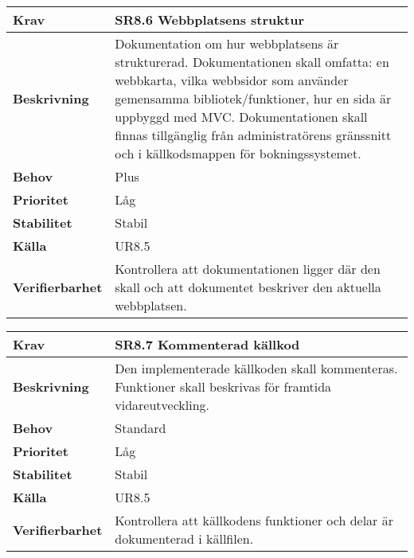 \documentclass[a4paper, twoside, 11pt, titlepage]{article}
\begin{document}
		\begin {table} [ht] \begin{tabular} { p{2.6cm} p{12.5cm} }
			\hline
			\sffamily\textbf{Krav} & \sffamily\textbf{SR8.6 Webbplatsens struktur } \\
			\hline
			\sffamily\textbf{Beskrivning} & Dokumentation om hur webbplatsens är strukturerad. Dokumentationen skall omfatta: en webbkarta, vilka webbsidor som använder gemensamma bibliotek/funktioner, hur en sida är uppbyggd med MVC. Dokumentationen skall finnas tillgänglig från administratörens gränssnitt och i  källkodsmappen för bokningssystemet.  \\
			\hline
			\sffamily\textbf{Behov} & Plus  \\
			\hline
			\sffamily\textbf{Prioritet} & Låg  \\
			\hline
			\sffamily\textbf{Stabilitet} & Stabil  \\
			\hline
			\sffamily\textbf{Källa} & UR8.5  \\
			\hline
			\sffamily\textbf{Verifierbarhet} & Kontrollera att dokumentationen ligger där den skall och att dokumentet beskriver den aktuella webbplatsen.  \\
			\hline
		\end{tabular} \end{table} \FloatBarrier
		\vspace{6mm}

		\begin {table} [ht] \begin{tabular} { p{2.6cm} p{12.5cm} }
			\hline
			\sffamily\textbf{Krav} & \sffamily\textbf{SR8.7 Kommenterad källkod } \\
			\hline
			\sffamily\textbf{Beskrivning} & Den implementerade källkoden skall kommenteras. Funktioner skall beskrivas för framtida vidareutveckling.  \\
			\hline
			\sffamily\textbf{Behov} & Standard  \\
			\hline
			\sffamily\textbf{Prioritet} & Låg  \\
			\hline
			\sffamily\textbf{Stabilitet} & Stabil  \\
			\hline
			\sffamily\textbf{Källa} & UR8.5  \\
			\hline
			\sffamily\textbf{Verifierbarhet} & Kontrollera att källkodens funktioner och delar är dokumenterad i källfilen.  \\
			\hline
		\end{tabular} \end{table} \FloatBarrier
\end{document}
